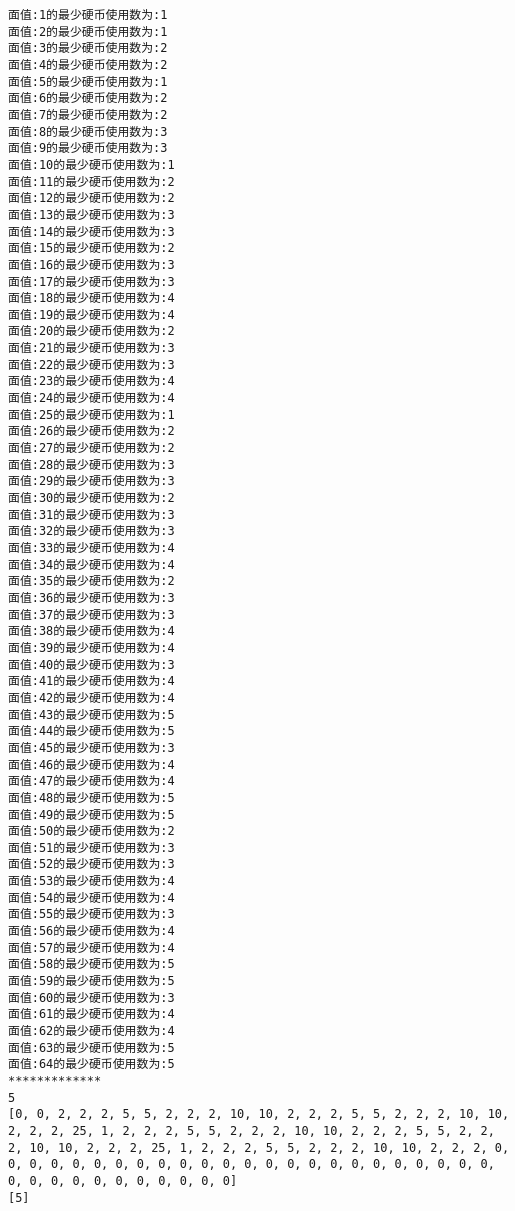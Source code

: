 \documentclass[11pt]{article}
\begin{document}
    \begin{Verbatim}[commandchars=\\\{\}]
面值:1的最少硬币使用数为:1
面值:2的最少硬币使用数为:1
面值:3的最少硬币使用数为:2
面值:4的最少硬币使用数为:2
面值:5的最少硬币使用数为:1
面值:6的最少硬币使用数为:2
面值:7的最少硬币使用数为:2
面值:8的最少硬币使用数为:3
面值:9的最少硬币使用数为:3
面值:10的最少硬币使用数为:1
面值:11的最少硬币使用数为:2
面值:12的最少硬币使用数为:2
面值:13的最少硬币使用数为:3
面值:14的最少硬币使用数为:3
面值:15的最少硬币使用数为:2
面值:16的最少硬币使用数为:3
面值:17的最少硬币使用数为:3
面值:18的最少硬币使用数为:4
面值:19的最少硬币使用数为:4
面值:20的最少硬币使用数为:2
面值:21的最少硬币使用数为:3
面值:22的最少硬币使用数为:3
面值:23的最少硬币使用数为:4
面值:24的最少硬币使用数为:4
面值:25的最少硬币使用数为:1
面值:26的最少硬币使用数为:2
面值:27的最少硬币使用数为:2
面值:28的最少硬币使用数为:3
面值:29的最少硬币使用数为:3
面值:30的最少硬币使用数为:2
面值:31的最少硬币使用数为:3
面值:32的最少硬币使用数为:3
面值:33的最少硬币使用数为:4
面值:34的最少硬币使用数为:4
面值:35的最少硬币使用数为:2
面值:36的最少硬币使用数为:3
面值:37的最少硬币使用数为:3
面值:38的最少硬币使用数为:4
面值:39的最少硬币使用数为:4
面值:40的最少硬币使用数为:3
面值:41的最少硬币使用数为:4
面值:42的最少硬币使用数为:4
面值:43的最少硬币使用数为:5
面值:44的最少硬币使用数为:5
面值:45的最少硬币使用数为:3
面值:46的最少硬币使用数为:4
面值:47的最少硬币使用数为:4
面值:48的最少硬币使用数为:5
面值:49的最少硬币使用数为:5
面值:50的最少硬币使用数为:2
面值:51的最少硬币使用数为:3
面值:52的最少硬币使用数为:3
面值:53的最少硬币使用数为:4
面值:54的最少硬币使用数为:4
面值:55的最少硬币使用数为:3
面值:56的最少硬币使用数为:4
面值:57的最少硬币使用数为:4
面值:58的最少硬币使用数为:5
面值:59的最少硬币使用数为:5
面值:60的最少硬币使用数为:3
面值:61的最少硬币使用数为:4
面值:62的最少硬币使用数为:4
面值:63的最少硬币使用数为:5
面值:64的最少硬币使用数为:5
*************
5
[0, 0, 2, 2, 2, 5, 5, 2, 2, 2, 10, 10, 2, 2, 2, 5, 5, 2, 2, 2, 10, 10, 2, 2, 2, 25, 1, 2, 2, 2, 5, 5, 2, 2, 2, 10, 10, 2, 2, 2, 5, 5, 2, 2, 2, 10, 10, 2, 2, 2, 25, 1, 2, 2, 2, 5, 5, 2, 2, 2, 10, 10, 2, 2, 2, 0, 0, 0, 0, 0, 0, 0, 0, 0, 0, 0, 0, 0, 0, 0, 0, 0, 0, 0, 0, 0, 0, 0, 0, 0, 0, 0, 0, 0, 0, 0, 0, 0, 0, 0]
[5]

    \end{Verbatim}
\end{document}
